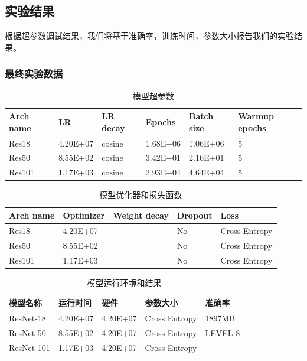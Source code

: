 \documentclass[hyperref, UTF8, 12pt]{article}
\theoremstyle{definition}
\begin{document}
\subsection{实验结果}
根据超参数调试结果，我们将基于准确率，训练时间，参数大小报告我们的实验结果。
\subsubsection{最终实验数据}
\begin{table}[h]
	\centering
	\caption{模型超参数}
	\begin{tabular}{l|l|l|l|l|l}
		\toprule
		Arch name & LR       & LR decay & Epochs   & Batch size & Warmup epochs \\ \midrule
		Res18     & 4.20E+07 & cosine   & 1.68E+06 & 1.06E+06   & 5             \\ \midrule
		Res50     & 8.55E+02 & cosine   & 3.42E+01 & 2.16E+01   & 5              \\ \midrule
		Res101    & 1.17E+03 & cosine   & 2.93E+04 & 4.64E+04   &  5            \\ \bottomrule
	\end{tabular}
\end{table}

\begin{table}[h]
	\centering
	\caption{模型优化器和损失函数}
	\begin{tabular}{l|l|l|l|l}
		\toprule
		Arch name & Optimizer& Weight decay & Dropout   & Loss           \\ \midrule
		Res18     & 4.20E+07 &         	    & No 	     & Cross Entropy  \\ \midrule
		Res50     & 8.55E+02 &              & No         & Cross Entropy  \\ \midrule
		Res101    & 1.17E+03 &              & No         & Cross Entropy  \\ \bottomrule
	\end{tabular}
\end{table}

\begin{table}[h]
	\centering
	\caption{模型运行环境和结果}
	\begin{tabular}{l|l|l|l|l}
		\toprule
		模型名称       & 运行时间      & 硬件         & 参数大小     & 准确率 	 \\ \midrule
		ResNet-18     & 4.20E+07     & 4.20E+07     & Cross Entropy  & 1897MB        \\ \midrule
		ResNet-50     & 8.55E+02     & 4.20E+07     & Cross Entropy  & LEVEL 8       \\ \midrule
		ResNet-101    & 1.17E+03     & 4.20E+07      & Cross Entropy &               \\ \bottomrule
	\end{tabular}
\end{table}
\end{document}

